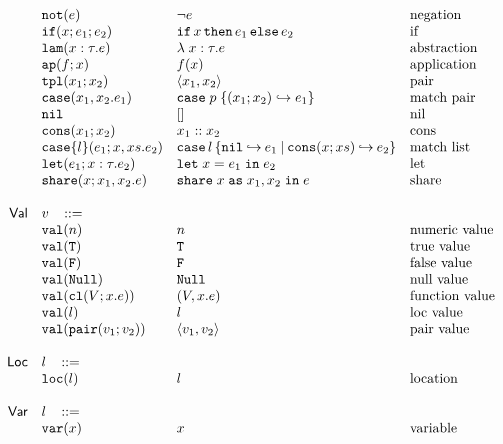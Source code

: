 \documentclass[11pt]{article}
\newcommand{\ms}[1]{\ensuremath{\mathsf{#1}}}
\newcommand{\irl}[1]{\mathtt{#1}}
\newcommand{\paircaseabt}[4]{\irl{case}(#2,#3.#4)}
\newcommand{\paircasecst}[4]{\irl{case} \; #1\; \{(#2;#3) \hookrightarrow #4\}}
\newcommand{\sharecst}[4]{\irl{share}\;#1\;\irl{as}\;#2,#3\;\irl{in}\;#4}
\newcommand{\shareabt}[4]{\irl{share}(#1;#2,#3.#4)}
\theoremstyle{definition}
\begin{document}
\[\begin{array}{r l l l l}
	& \irl{not}(e)	   			& \lnot e											& \text{negation}\\
  & \ifexabt{x}{e_1}{e_2} & \ifexcst{x}{e_1}{e_2}  & \text{if}\\
  & \irl{lam}(x:\tau.e) 						&\lambda \; x : \tau. e 		& \text{abstraction}\\
  & \irl{ap}(f;x) 					& \appcst{f}{x} 										& \text{application}\\
  & \irl{tpl}(x_1;x_2)     	& \pairexcst{x_1}{x_2}                									& \text{pair}\\
 	& \paircaseabt{p}{x_1}{x_2}{e_1}					& \paircasecst{p}{x_1}{x_2}{e_1}   	& \text{match pair}\\
 	& \nilexabt					& []   										& \text{nil}\\
 	& \consexabt{x_1}{x_2}					& x_1::x_2   										& \text{cons}\\
 	& \listcaseexabt{l}{e_1}{x}{xs}{e_2}					& \listcaseexcst{l}{e_1}{x}{xs}{e_2}   	& \text{match list}\\
  & \irl{let}(e_1; x : \tau.e_2)			& \irl{let}\; x = e_1 \; \irl{in}\; e_2   	& \text{let}\\
  & \shareabt{x}{x_1}{x_2}{e} &\sharecst{x}{x_1}{x_2}{e} &\text{share}\\
  \\
\ms{Val}
        & v   \,\,\,\,\, ::= \\
 	& \irl{val}(n)                                			& n 												& \text{numeric value}\\
 	& \irl{val}(\irl{T})                               			& \irl{T} 								  & \text{true value}\\
 	& \irl{val}(\irl{F})                                			& \irl{F}								  & \text{false value}\\
 	& \irl{val}(\irl{Null})                                  & \irl{Null} 								  & \text{null value}\\
 	& \irl{val}(\irl{cl}(V; x.e))                & (V, x.e) 					& \text{function value}\\
 	& \irl{val}(l)                                			& l 								  & \text{loc value}\\
 	& \irl{val}(\pairexabt{v_1}{v_2})                             & \pairexcst{v_1}{v_2} 								  & \text{pair value}\\
  \\
\ms{Loc} & l   \,\,\,\,\, ::= \\
 	& \irl{loc}(l)                                			& l 												& \text{location}\\\\
\ms{Var} & l   \,\,\,\,\, ::= \\
 	& \irl{var}(x)                                			& x 												& \text{variable}\\
\end{array}
\]
\end{document}
